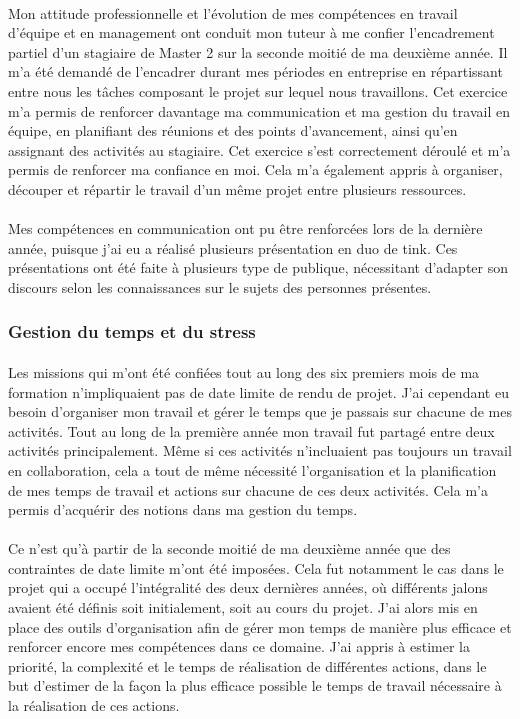 \documentclass[12pt,a4paper]{report}
\begin{document}
\paragraph*{}Mon attitude professionnelle et l'évolution de mes compétences en travail d'équipe et en  management ont conduit mon tuteur à me confier l'encadrement partiel d'un stagiaire de Master 2 sur la seconde moitié de ma deuxième année. Il m'a été demandé de l'encadrer durant mes périodes en entreprise en répartissant entre nous les tâches composant le projet sur lequel nous travaillons. Cet exercice m'a permis de renforcer davantage ma communication et ma gestion du travail en équipe, en planifiant des réunions et des points d'avancement, ainsi qu'en assignant des activités au stagiaire. Cet exercice s'est correctement déroulé et m'a permis de renforcer ma confiance en moi. Cela m'a également appris à organiser, découper et répartir le travail d'un même projet entre plusieurs ressources.
\paragraph*{}Mes compétences en communication ont pu être renforcées lors de la dernière année, puisque j'ai eu a réalisé plusieurs présentation en duo de \gls{tink}. Ces présentations ont été faite à plusieurs type de publique, nécessitant d'adapter son discours selon les connaissances sur le sujets des personnes présentes. \\
\subsubsection{Gestion du temps et du stress}
\paragraph*{}Les missions qui m'ont été confiées tout au long des six premiers mois de ma formation n'impliquaient pas de date limite de rendu de projet. J'ai cependant eu besoin d'organiser mon travail et gérer le temps que je passais sur chacune de mes activités. Tout au long de la première année mon travail fut partagé entre deux activités principalement. Même si ces activités n'incluaient pas toujours un travail en collaboration, cela a tout de même nécessité l'organisation et la planification de mes temps de travail et actions sur chacune de ces deux activités. Cela m'a permis d'acquérir des notions dans ma gestion du temps.
\paragraph*{}Ce n'est qu'à partir de la seconde moitié de ma deuxième année que des contraintes de date limite m'ont été imposées. Cela fut notamment le cas dans le projet qui a occupé l'intégralité des deux dernières années, où différents jalons avaient été définis soit initialement, soit au cours du projet. J'ai alors mis en place des outils d’organisation afin de gérer mon temps de manière plus efficace et renforcer encore mes compétences dans ce domaine. J'ai appris à estimer la priorité, la complexité et le temps de réalisation de différentes actions, dans le but d’estimer de la façon la plus efficace possible le temps de travail nécessaire à la réalisation de ces actions.
\end{document}
